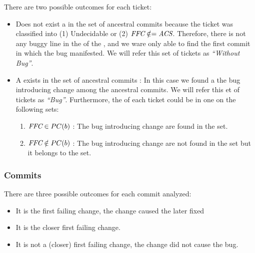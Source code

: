 \documentclass[a4paper, 12pt]{book}
\begin{document}
There are two possible outcomes for each ticket:

\begin{itemize}
	\item Does not exist a \FFC in the set of ancestral commits  because the ticket was classified into (1) Undecidable \FFC or (2) $ \emph{FFC} \notin= \emph{ACS}$. Therefore, there is not any buggy line in the \ACS of the \BFC, and we ware only able to find the first commit in which the bug manifested. We will refer this set of tickets as \textit{``Without Bug''}.
	\item A \FFC exists in the set of ancestral commits : In this case we found a the bug introducing change among the ancestral commits. We will refer this et of tickets as \textit{``Bug''}. Furthermore, the \FFC of each ticket could be in one on the following sets:
		\begin{enumerate}
			\item $\FFC \in {}$ : The bug introducing change are found in the \PC{b} set.
			\item $\emph{FFC} \notin PC(b)$ : The bug introducing change are not found in the  set but it belongs to the  set.
		\end{enumerate}
\end{itemize}

\subsubsection{Commits}

There are three possible outcomes for each commit analyzed:
\begin{itemize}
	\item It is the first failing change, the change caused the later fixed%
	\item It is the closer first failing change.
	\item It is not a (closer) first failing change, the change did not cause the bug. %
\end{itemize}
\end{document}
